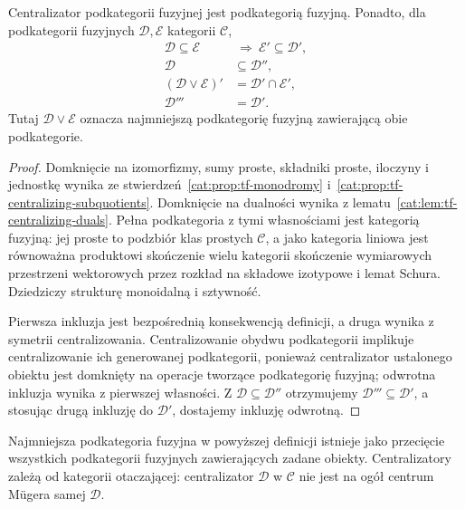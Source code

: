 \begin{stwierdzenie}\label{cat:prop:tf-centralizer-laws}
Centralizator podkategorii fuzyjnej jest podkategorią fuzyjną. Ponadto, dla podkategorii fuzyjnych $\mathcal D,\mathcal E$ kategorii $\mathcal C$,
\[
\begin{aligned}
 \mathcal D\subseteq\mathcal E &\ \Longrightarrow\ \mathcal E'\subseteq\mathcal D',\\
 \mathcal D&\subseteq\mathcal D'',\\
 (\mathcal D\vee\mathcal E)'&=\mathcal D'\cap\mathcal E',\\
 \mathcal D'''&=\mathcal D'.
\end{aligned}
\]
Tutaj $\mathcal D\vee\mathcal E$ oznacza najmniejszą podkategorię fuzyjną zawierającą obie podkategorie.
\end{stwierdzenie}
\begin{proof}
Domknięcie na izomorfizmy, sumy proste, składniki proste, iloczyny i jednostkę wynika ze stwierdzeń~\ref{cat:prop:tf-monodromy} i~\ref{cat:prop:tf-centralizing-subquotients}. Domknięcie na dualności wynika z lematu~\ref{cat:lem:tf-centralizing-duals}. Pełna podkategoria z tymi własnościami jest kategorią fuzyjną: jej proste to podzbiór klas prostych $\mathcal C$, a jako kategoria liniowa jest równoważna produktowi skończenie wielu kategorii skończenie wymiarowych przestrzeni wektorowych przez rozkład na składowe izotypowe i lemat Schura. Dziedziczy strukturę monoidalną i sztywność.

Pierwsza inkluzja jest bezpośrednią konsekwencją definicji, a druga wynika z symetrii centralizowania. Centralizowanie obydwu podkategorii implikuje centralizowanie ich generowanej podkategorii, ponieważ centralizator ustalonego obiektu jest domknięty na operacje tworzące podkategorię fuzyjną; odwrotna inkluzja wynika z pierwszej własności. Z $\mathcal D\subseteq\mathcal D''$ otrzymujemy $\mathcal D'''\subseteq\mathcal D'$, a stosując drugą inkluzję do $\mathcal D'$, dostajemy inkluzję odwrotną.
\end{proof}

Najmniejsza podkategoria fuzyjna w powyższej definicji istnieje jako przecięcie wszystkich podkategorii fuzyjnych zawierających zadane obiekty. Centralizatory zależą od kategorii otaczającej: centralizator $\mathcal D$ w $\mathcal C$ nie jest na ogół centrum Mügera samej $\mathcal D$.

